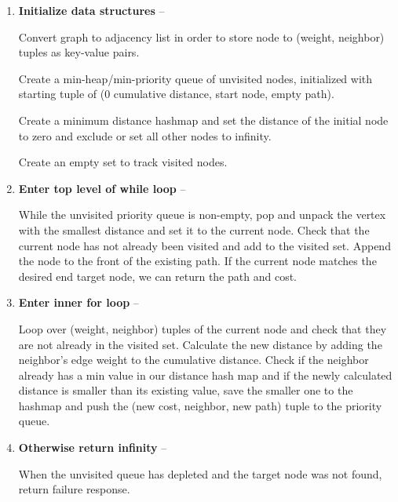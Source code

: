 \documentclass{article}
\begin{document}
    \begin{enumerate}
        \item \textbf{Initialize data structures} -- 
        
        Convert graph to adjacency list in order to store node to (weight, neighbor) tuples as key-value pairs.
         
        Create a min-heap/min-priority queue of unvisited nodes, initialized with starting tuple of (0 cumulative distance, start node, empty path). 
        
        Create a minimum distance hashmap and set the distance of the initial node to zero and exclude or set all other nodes to infinity. 
        
        Create an empty set to track visited nodes. 
        
        \item \textbf{Enter top level of while loop} -- 
        
        While the unvisited priority queue is non-empty, pop and unpack the vertex with the smallest distance and set it to the current node. Check that the current node has not already been visited and add to the visited set. Append the node to the front of the existing path. If the current node matches the desired end target node, we can return the path and cost.
        
        \item \textbf{Enter inner for loop} -- 
        
        Loop over (weight, neighbor) tuples of the current node and check that they are not already in the visited set. Calculate the new distance by adding the neighbor's edge weight to the cumulative distance. Check if the neighbor already has a min value in our distance hash map and if the newly calculated distance is smaller than its existing value, save the smaller one to the hashmap and push the (new cost, neighbor, new path) tuple to the priority queue. 
        
        \item \textbf{Otherwise return infinity} -- 
        
        When the unvisited queue has depleted and the target node was not found, return failure response.
    \end{enumerate}
    
\end{document}
